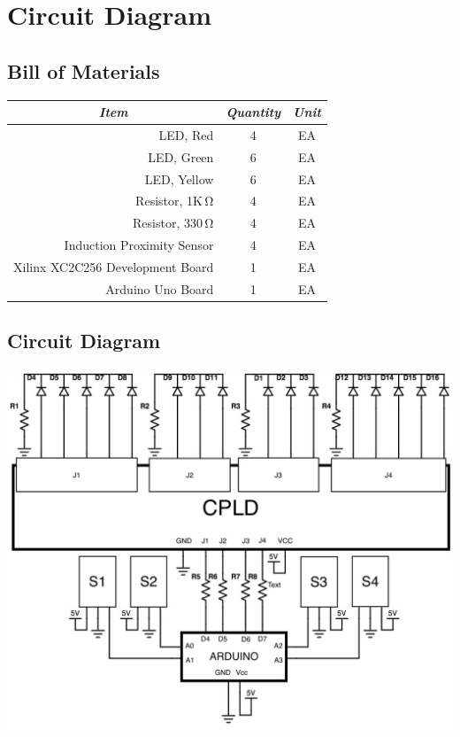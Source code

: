 \section{Circuit Diagram}
\subsection{Bill of Materials}
\begin{table}[h]
\begin{tabular}{|r|c|c|}
\hline
\multicolumn{1}{|c|}{\textit{Item}} & \textit{Quantity} & \textit{Unit} \\ \hline
LED, Red & 4 & EA \\ \hline
LED, Green & 6 & EA \\ \hline
LED, Yellow & 6 & EA \\ \hline
Resistor, 1K$\,\mathrm\Omega$ & 4 & EA \\ \hline
Resistor, 330$\,\mathrm\Omega$ & 4 & EA \\ \hline
Induction Proximity Sensor & 4 & EA \\ \hline
Xilinx XC2C256 Development Board & 1 & EA \\ \hline
Arduino Uno Board & 1 & EA \\ \hline
\end{tabular}
\end{table}

\subsection{Circuit Diagram}
\includegraphics[scale=0.50]{0623151841.jpg}

